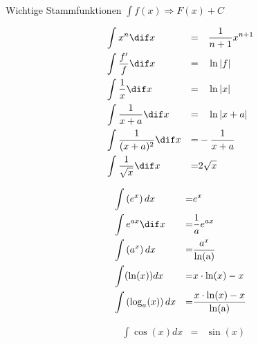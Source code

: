 

\begin{highlight}{Wichtige Stammfunktionen}
        $\int f(x) \Longrightarrow F(x) + C$
    \begin{center}
        \begin{minipage}{0.45\linewidth}
            \begin{align*}
                &\int x^n \dif x  &=&  \quad \frac{1}{n+1}x^{n+1}  \\
                &\int \frac{f'}{f} \dif x  &=&  \quad \ln \left\lvert f \right\rvert  \\
                &\int \frac{1}{x} \dif x  &=& \quad \ln \left\lvert x \right\rvert  \\
                &\int \frac{1}{x+a} \dif x  &=&  \quad \ln \left\lvert x+a \right\rvert \\
                &\int \frac{1}{(x+a)^2} \dif x  &=&  -\frac{1}{x+a}  \\
                &\int \frac{1}{\sqrt{x}}\dif x  &=&  2 \sqrt{x}  \\
            \end{align*}
        \end{minipage}
        \hfill\vline\hfill
        \begin{minipage}{0.45\linewidth}
            \begin{align*}
                &\int\left(e^{x}\right) d x  &=& e^{x} \\
                &\int e^{ax} \dif x  &=&  \frac{1}{a} e^{ax}  \\
                &\int\left(a^{x}\right) d x \quad  &=& \frac{a^{x}}{\ln (\mathrm{a})} \\
                &\int(\ln (x)) d x  &=& x \cdot \ln (x)-x \\
                &\int\left(\log _{a}(x)\right) d x  &=& \frac{x \cdot \ln (x)-x}{\ln (\mathrm{a})} \\
            \end{align*}
        \end{minipage}
    \end{center}
    \begin{center}
        \begin{minipage}{0.4\linewidth}
                \begin{align*}
                    &\int\cos (x) d x  &=& \sin (x) \\

\end{align*}
\end{minipage}
\end{center}
\end{highlight}
